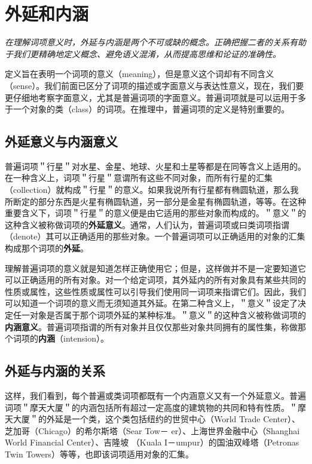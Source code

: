 \section{外延和内涵}

\begin{logicbox}[title=引言]
\textit{在理解词项意义时，外延与内涵是两个不可或缺的概念。正确把握二者的关系有助于我们更精确地定义概念、避免语义混淆，从而提高思维和论证的准确性。}
\end{logicbox}

定义旨在表明一个词项的意义（meaning），但是意义这个词却有不同含义（sense）。我们前面已区分了词项的描述或字面意义与表达性意义，现在，我们要更仔细地考察字面意义，尤其是普遍词项的字面意义。普遍词项就是可以运用于多于一个对象的类（class）的词项。在推理中，普遍词项的定义是特别重要的。

\subsection{外延意义与内涵意义}

普遍词项＂行星＂对水星、金星、地球、火星和土星等都是在同等含义上适用的。在一种含义上，词项＂行星＂意谓所有这些不同对象，而所有行星的汇集（collection）就构成＂行星＂的意义。如果我说所有行星都有椭圆轨道，那么我所断定的部分东西是火星有椭圆轨道，另一部分是金星有椭圆轨道，等等。在这种重要含义下，词项＂行星＂的意义便是由它适用的那些对象而构成的。＂意义＂的这种含义被称做词项的\textbf{外延意义}。通常，人们认为，普遍词项或曰类词项指谓（denote）其可以正确适用的那些对象。一个普遍词项可以正确适用的对象的汇集构成那个词项的\textbf{外延}。

理解普遍词项的意义就是知道怎样正确使用它；但是，这样做并不是一定要知道它可以正确适用的所有对象。对一个给定词项，其外延内的所有对象具有某些共同的性质或属性，这些性质或属性可以引导我们使用同一词项来指谓它们。因此，我们可以知道一个词项的意义而无须知道其外延。在第二种含义上，＂意义＂设定了决定任一对象是否属于那个词项外延的某种标准。＂意义＂的这种含义被称做词项的\textbf{内涵意义}。普遍词项指谓的所有对象并且仅仅那些对象共同拥有的属性集，称做那个词项的\textbf{内涵}（intension）。

\subsection{外延与内涵的关系}

这样，我们看到，每个普遍或类词项都既有一个内涵意义又有一个外延意义。普遍词项＂摩天大厦＂的内涵包括所有超过一定高度的建筑物的共同和特有性质。＂摩天大厦＂的外延是一个类，这个类包括纽约的世贸中心（World Trade Center）、芝加哥（Chicago）的希尔斯塔（Sear Tow－ er）、上海世界金融中心（Shanghai World Financial Center）、吉隆坡 （Kuala I－umpur）的国油双峰塔（Petronas Twin Towers）等等，也即该词项适用对象的汇集。

